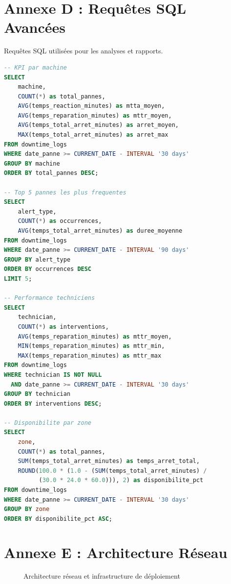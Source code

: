 \section{Annexe D : Requêtes SQL Avancées}

Requêtes SQL utilisées pour les analyses et rapports.

\begin{lstlisting}[language=SQL,caption={Requêtes SQL analytiques}]
-- KPI par machine
SELECT 
    machine,
    COUNT(*) as total_pannes,
    AVG(temps_reaction_minutes) as mtta_moyen,
    AVG(temps_reparation_minutes) as mttr_moyen,
    AVG(temps_total_arret_minutes) as arret_moyen,
    MAX(temps_total_arret_minutes) as arret_max
FROM downtime_logs
WHERE date_panne >= CURRENT_DATE - INTERVAL '30 days'
GROUP BY machine
ORDER BY total_pannes DESC;

-- Top 5 pannes les plus frequentes
SELECT 
    alert_type,
    COUNT(*) as occurrences,
    AVG(temps_total_arret_minutes) as duree_moyenne
FROM downtime_logs
WHERE date_panne >= CURRENT_DATE - INTERVAL '90 days'
GROUP BY alert_type
ORDER BY occurrences DESC
LIMIT 5;

-- Performance techniciens
SELECT 
    technician,
    COUNT(*) as interventions,
    AVG(temps_reparation_minutes) as mttr_moyen,
    MIN(temps_reparation_minutes) as mttr_min,
    MAX(temps_reparation_minutes) as mttr_max
FROM downtime_logs
WHERE technician IS NOT NULL
  AND date_panne >= CURRENT_DATE - INTERVAL '30 days'
GROUP BY technician
ORDER BY interventions DESC;

-- Disponibilite par zone
SELECT 
    zone,
    COUNT(*) as total_pannes,
    SUM(temps_total_arret_minutes) as temps_arret_total,
    ROUND(100.0 * (1.0 - (SUM(temps_total_arret_minutes) / 
          (30.0 * 24.0 * 60.0))), 2) as disponibilite_pct
FROM downtime_logs
WHERE date_panne >= CURRENT_DATE - INTERVAL '30 days'
GROUP BY zone
ORDER BY disponibilite_pct ASC;
\end{lstlisting}

\section{Annexe E : Architecture Réseau}

\begin{figure}[htbp]
\centering
{}
\caption{Architecture réseau et infrastructure de déploiement}
\label{fig:network_architecture}
\end{figure}

